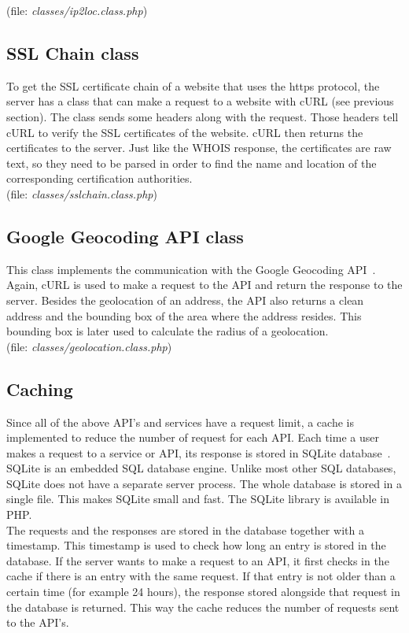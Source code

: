 \documentclass[twoside,openright,notitlepage]{uva-bachelor-thesis}
\begin{document}
(file: \emph{classes/ip2loc.class.php})

\subsection{SSL Chain class}
To get the SSL certificate chain of a website that uses the https protocol, the server has a class that can make a request to a website with cURL (see previous section). The class sends some headers along with the request. Those headers tell cURL to verify the SSL certificates of the website. cURL then returns the certificates to the server. Just like the WHOIS response, the certificates are raw text, so they need to be parsed in order to find the name and location of the corresponding certification authorities. \\

(file: \emph{classes/sslchain.class.php})

\subsection{Google Geocoding API class}
This class implements the communication with the Google Geocoding API~\cite{google1}. Again, cURL is used to make a request to the API and return the response to the server. Besides the geolocation of an address, the API also returns a clean address and the bounding box of the area where the address resides. This bounding box is later used to calculate the radius of a geolocation. \\

(file: \emph{classes/geolocation.class.php})

\subsection{Caching}
Since all of the above API's and services have a request limit, a cache is implemented to reduce the number of request for each API. Each time a user makes a request to a service or API, its response is stored in SQLite database~\cite{sqlite}. SQLite is an embedded SQL database engine. Unlike most other SQL databases, SQLite does not have a separate server process. The whole database is stored in a single file. This makes SQLite small and fast. The SQLite library is available in PHP.\\

The requests and the responses are stored in the database together with a timestamp. This timestamp is used to check how long an entry is stored in the database. If the server wants to make a request to an API, it first checks in the cache if there is an entry with the same request. If that entry is not older than a certain time (for example 24 hours), the response stored alongside that request in the database is returned. This way the cache reduces the number of requests sent to the API's. \\
\end{document}
